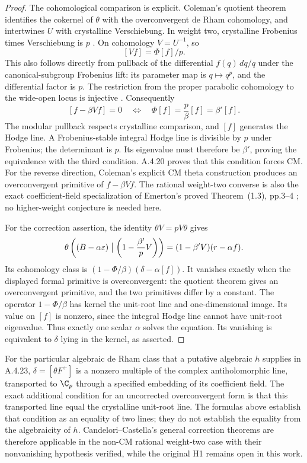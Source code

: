 \begin{proof}
The cohomological comparison is explicit. Coleman's quotient theorem identifies the cokernel of $\theta$ with the overconvergent de Rham cohomology, and intertwines $U$ with crystalline Verschiebung. In weight two, crystalline Frobenius times Verschiebung is $p$ \cite[Theorems 5.1 and 5.4, pp.223 and 225]{EllColeman1996}. On cohomology $V=U^{-1}$, so
\[
 [Vf]=\Phi[f]/p.
\]
This also follows directly from pullback of the differential $f(q)\,dq/q$ under the canonical-subgroup Frobenius lift: its parameter map is $q\mapsto q^p$, and the differential factor is $p$. The restriction from the proper parabolic cohomology to the wide-open locus is injective \cite[equation (6), p.6]{EllCandeloriCastella2017}. Consequently
\[
 [f-\beta Vf]=0
 \quad\Longleftrightarrow\quad
 \Phi[f]=\frac p\beta[f]=\beta'[f].
\]
The modular pullback respects crystalline comparison, and $[f]$ generates the Hodge line. A Frobenius-stable integral Hodge line is divisible by $p$ under Frobenius; the determinant is $p$. Its eigenvalue must therefore be $\beta'$, proving the equivalence with the third condition. A.4.20 proves that this condition forces CM. For the reverse direction, Coleman's explicit CM theta construction \cite[Proposition 7.1, p.231]{EllColeman1996} produces an overconvergent primitive of $f-\beta Vf$. The rational weight-two converse is also the exact coefficient-field specialization of Emerton's proved Theorem~(1.3), pp.3--4 \cite{EllEmertonCM}; no higher-weight conjecture is needed here.

For the correction assertion, the identity $\theta V=pV\theta$ gives
\[
 \theta\left((B-\alpha\varepsilon)\bigm|\left(1-\frac{\beta'}pV\right)\right)
 =(1-\beta' V)(r-\alpha f).
\]
Its cohomology class is
$(1-\Phi/\beta)(\delta-\alpha[f])$. It vanishes exactly when the displayed formal primitive is overconvergent: the quotient theorem gives an overconvergent primitive, and the two primitives differ by a constant. The operator $1-\Phi/\beta$ has kernel the unit-root line and one-dimensional image. Its value on $[f]$ is nonzero, since the integral Hodge line cannot have unit-root eigenvalue. Thus exactly one scalar $\alpha$ solves the equation. Its vanishing is equivalent to $\delta$ lying in the kernel, as asserted.
\end{proof}

For the particular algebraic de Rham class that a putative algebraic $h$ supplies in A.4.23, $\delta=[\theta F^+]$ is a nonzero multiple of the complex antiholomorphic line, transported to $\C_p$ through a specified embedding of its coefficient field. The exact additional condition for an uncorrected overconvergent form is that this transported line equal the crystalline unit-root line. The formulas above establish that condition as an equality of two lines; they do not establish the equality from the algebraicity of $h$. Candelori--Castella's general correction theorems \cite[Theorems 5.3 and 5.5, pp.11--12]{EllCandeloriCastella2017} are therefore applicable in the non-CM rational weight-two case with their nonvanishing hypothesis verified, while the original H1 remains open in this work.



